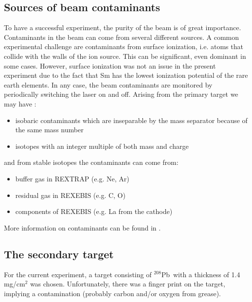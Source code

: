 \documentclass[twoside,english]{uiofysmaster/uiofysmaster}
\newcommand{\Pb}{$^{208}$Pb}
\begin{document}
\subsection{Sources of beam contaminants}\label{ssec:bcontaminants}
To have a successful experiment, the purity of the beam is of great importance. Contaminants in the beam can come from several different sources. 
A common experimental challenge are contaminants from surface ionization, i.e. atoms that collide with the walls of the ion source. 
This can be significant, even dominant in some cases. 
However, surface ionization was not an issue in the present experiment due to the fact that Sm has the lowest ionization potential of the rare earth elements. 
In any case, the beam contaminants are monitored by periodically switching the laser on and off.
Arising from the primary target we may have \cite{MB-spect}:
\begin{itemize}
	\item isobaric contaminants which are inseparable by the mass separator because of the same mass number
	\item isotopes with an integer multiple of both mass and charge
\end{itemize}
and from stable isotopes the contaminants can come from:
\begin{itemize}
	\item buffer gas in REXTRAP (e.g. Ne, Ar)
	\item residual gas in REXEBIS (e.g. C, O)
	\item components of REXEBIS (e.g. La from the cathode)
\end{itemize}
More information on contaminants can be found in \cite{HIE-ISOLDE, RILIS, MB-spect}.


\subsection{The secondary target}\label{ssec:Pb}
For the current experiment, a target consisting of \Pb\ with a thickness of 1.4 mg/cm$^2$ was chosen. 
Unfortunately, there was a finger print on the target, implying a contamination (probably carbon and/or oxygen from grease).
\end{document}
